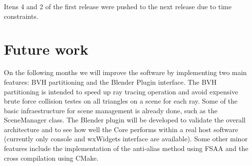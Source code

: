 \documentclass[a4paper]{sbgames}               %
\begin{document}
Itens 4 and 2 of the first release were pushed to the next release due
to time constraints.

\section{Future work}
\label{sec:future}

On the following months we will improve the software by implementing
two main features: BVH partitioning and the Blender Plugin interface.
The BVH partitioning is intended to speed up ray tracing operation and
avoid expensive brute force collision testes on all triangles on a
scene for each ray. Some of the basic infraestructure for scene
management is already done, such as the SceneManager class.  The
Blender plugin will be developed to validate the overall architecture
and to see how well the Core performs within a real host software
(currently only console and wxWidgets interface are available). Some
other minor features include the implementation of the anti-alias
method using FSAA and the cross compilation using CMake.





\end{document}
